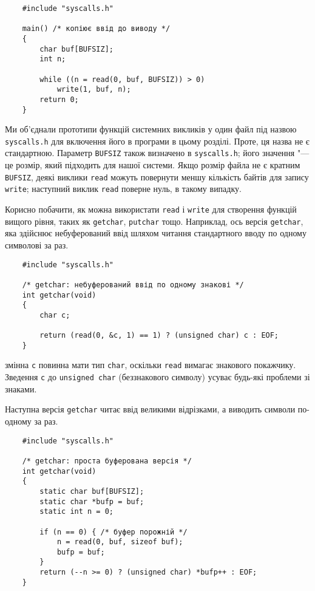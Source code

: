 \documentclass[a4paper,12pt]{book}
\begin{document}
  \begin{verbatim}
    #include "syscalls.h"

    main() /* копіює ввід до виводу */
    {
        char buf[BUFSIZ];
        int n;

        while ((n = read(0, buf, BUFSIZ)) > 0)
            write(1, buf, n);
        return 0;
    }
  \end{verbatim}

  Ми об'єднали прототипи функцій системних викликів у один файл під назвою
  \texttt{syscalls.h} для включення його в програми в цьому розділі. Проте, ця назва не є
  стандартною. Параметр \texttt{BUFSIZ} також визначено в \texttt{syscalls.h}; його
  значення "--- це розмір, який підходить для нашої системи. Якщо розмір файла не є
  кратним \texttt{BUFSIZ}, деякі виклики \texttt{read} можуть повернути меншу кількість
  байтів для запису \texttt{write}; наступний виклик \texttt{read} поверне нуль, в такому
  випадку.

  Корисно побачити, як можна використати \texttt{read} і \texttt{write} для створення
  функцій вищого рівня, таких як \texttt{getchar}, \texttt{putchar} тощо. Наприклад, ось
  версія \texttt{getchar}, яка здійснює небуферований ввід шляхом читання стандартного
  вводу по одному символові за раз.
  \begin{verbatim}
    #include "syscalls.h"

    /* getchar: небуферований ввід по одному знакові */
    int getchar(void)
    {
        char c;

        return (read(0, &c, 1) == 1) ? (unsigned char) c : EOF;
    }
  \end{verbatim}
  змінна \texttt{c} повинна мати тип \texttt{char}, оскільки \texttt{read} вимагає
  знакового покажчику. Зведення \texttt{c} до \texttt{unsigned char} (беззнакового
  символу) усуває будь-які проблеми зі знаками.

  Наступна версія \texttt{getchar} читає ввід великими відрізками, а виводить символи
  по-одному за раз.
  \begin{verbatim}
    #include "syscalls.h"

    /* getchar: проста буферована версія */
    int getchar(void)
    {
        static char buf[BUFSIZ];
        static char *bufp = buf;
        static int n = 0;

        if (n == 0) { /* буфер порожній */
            n = read(0, buf, sizeof buf);
            bufp = buf;
        }
        return (--n >= 0) ? (unsigned char) *bufp++ : EOF;
    }
  \end{verbatim}
\end{document}

